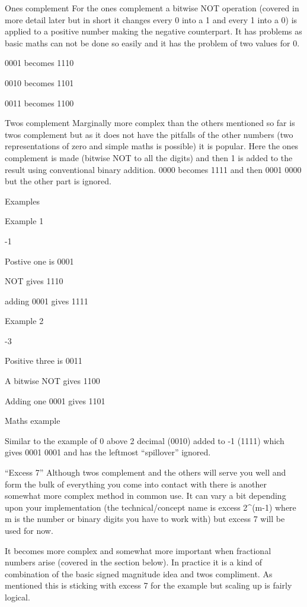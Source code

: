 \documentclass[
]{book}
\begin{document}
Ones complement For the ones complement a bitwise NOT operation (covered in more detail later but in short it changes every 0 into a 1 and every 1 into a 0) is applied to a positive number making the negative counterpart. It has problems as basic maths can not be done so easily and it has the problem of two values for 0.

0001 becomes 1110

0010 becomes 1101

0011 becomes 1100

Twos complement Marginally more complex than the others mentioned so far is twos complement but as it does not have the pitfalls of the other numbers (two representations of zero and simple maths is possible) it is popular. Here the ones complement is made (bitwise NOT to all the digits) and then 1 is added to the result using conventional binary addition. 0000 becomes 1111 and then 0001 0000 but the other part is ignored.

Examples

Example 1

-1

Postive one is 0001

NOT gives 1110

adding 0001 gives 1111

Example 2

-3

Positive three is 0011

A bitwise NOT gives 1100

Adding one 0001 gives 1101

Maths example

Similar to the example of 0 above 2 decimal (0010) added to -1 (1111) which gives 0001 0001 and has the leftmost ``spillover'' ignored.

``Excess 7'' Although twos complement and the others will serve you well and form the bulk of everything you come into contact with there is another somewhat more complex method in common use. It can vary a bit depending upon your implementation (the technical/concept name is excess 2\^{}(m-1) where m is the number or binary digits you have to work with) but excess 7 will be used for now.

It becomes more complex and somewhat more important when fractional numbers arise (covered in the section below). In practice it is a kind of combination of the basic signed magnitude idea and twos compliment. As mentioned this is sticking with excess 7 for the example but scaling up is fairly logical.
\end{document}
